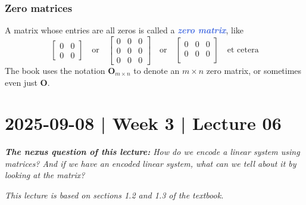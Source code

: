 \documentclass[10pt]{article}
\newcommand{\demph}[1]{\textcolor{RoyalBlue}{\textbf{\slshape #1}}} %
\theoremstyle{definition}
\begin{document}
\subsubsection{Zero matrices}

A matrix whose entries are all zeros is called a \demph{zero matrix}, like
\begin{equation*}
  \begin{bmatrix}
    0&0\\
    0&0
  \end{bmatrix}
  \quad \text{or} \quad
  \begin{bmatrix}
    0&0&0\\
    0&0&0\\
    0&0&0
  \end{bmatrix}
  \quad \text{or} \quad
  \begin{bmatrix}
    0&0&0\\
    0&0&0\\
  \end{bmatrix}
  \quad \text{et cetera}
\end{equation*}
The book uses the notation $\mathbf{O}_{m\times n}$ to denote an $m\times n$
zero matrix, or sometimes even just $\mathbf{O}$.

\newpage
\section{2025-09-08 | Week 3 | Lecture 06}

\begin{center}
  \begin{tcolorbox}[width=0.9\textwidth, colback=white, colframe=black]
    \textit{\textbf{The nexus question of this lecture:} How do we encode a
      linear system using matrices? And if we have an encoded linear system,
      what can we tell about it by looking at the matrix?}
  \end{tcolorbox}
\end{center}

\textit{This lecture is based on sections 1.2 and 1.3 of the textbook.} 
\end{document}
